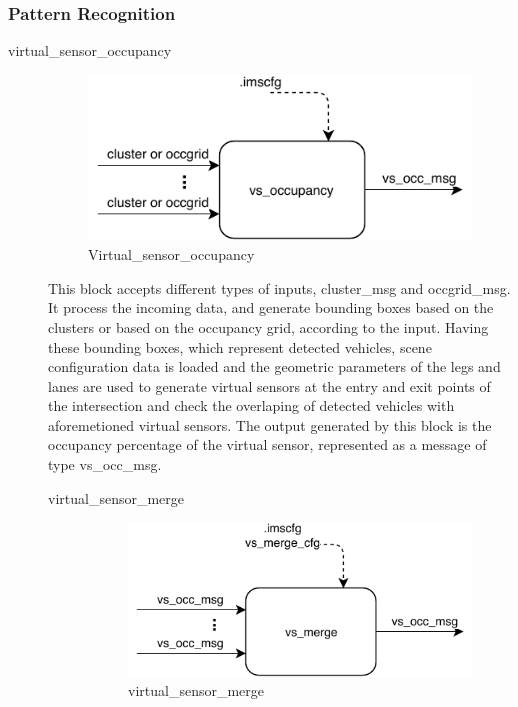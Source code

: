 \subsubsection{Pattern Recognition}
\begin{description}

\item[virtual\_sensor\_occupancy] \hfill

\begin{figure}[ht!]
\centering
\includegraphics[scale=1]{fig/3/vs_occ.pdf}
\caption{Virtual\_sensor\_occupancy}
\label{vehicle_counter}
\end{figure}

This block accepts different types of inputs, cluster\_msg and occgrid\_msg. It process the incoming data, and generate bounding boxes based on the clusters or based on the occupancy grid, according to the input. Having these bounding boxes, which represent detected vehicles, scene configuration data is loaded and the geometric parameters of the legs and lanes are used to generate virtual sensors at the entry and exit points of the intersection and check the overlaping of detected vehicles with aforemetioned virtual sensors. The output generated by this block is the occupancy percentage of the virtual sensor, represented as a message of type vs\_occ\_msg.


\begin{description}

\item[virtual\_sensor\_merge] \hfill
\begin{figure}[ht!]
\centering
\includegraphics[scale=1]{fig/3/vs_merge.pdf}
\caption{virtual\_sensor\_merge}
\label{virtual_sensor_merge}
\end{figure}


\end{description}
\end{description}

